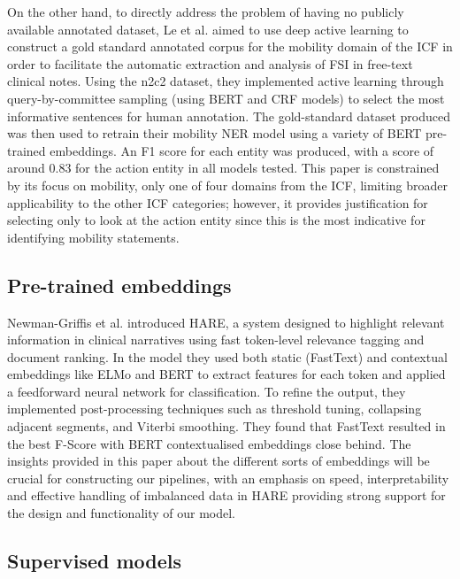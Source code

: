 On the other hand, to directly address the problem of having no publicly available annotated dataset, Le et al. \cite{le2023} aimed to use deep active learning to construct a gold standard annotated corpus for the mobility domain of the ICF in order to facilitate the automatic extraction and analysis of FSI in free-text clinical notes. Using the n2c2 dataset, they implemented active learning through query-by-committee sampling (using BERT and CRF models) to select the most informative sentences for human annotation. The gold-standard dataset produced was then used to retrain their mobility NER model using a variety of BERT pre-trained embeddings. An F1 score for each entity was produced, with a score of around 0.83 for the action entity in all models tested. This paper is constrained by its focus on mobility, only one of four domains from the ICF, limiting broader applicability to the other ICF categories; however, it provides justification for selecting only to look at the action entity since this is the most indicative for identifying mobility statements.

\subsection{Pre-trained embeddings}

Newman-Griffis et al. \cite{newman-griffis2019hare} introduced HARE, a system designed to highlight relevant information in clinical narratives using fast token-level relevance tagging and document ranking. In the model they used both static (FastText) and contextual embeddings like ELMo and BERT to extract features for each token and applied a feedforward neural network for classification. To refine the output, they implemented post-processing techniques such as threshold tuning, collapsing adjacent segments, and Viterbi smoothing. They found that FastText resulted in the best F-Score with BERT contextualised embeddings close behind. The insights provided in this paper about the different sorts of embeddings will be crucial for constructing our pipelines, with an emphasis on speed, interpretability and effective handling of imbalanced data in HARE providing strong support for the design and functionality of our model.

\subsection{Supervised models}

